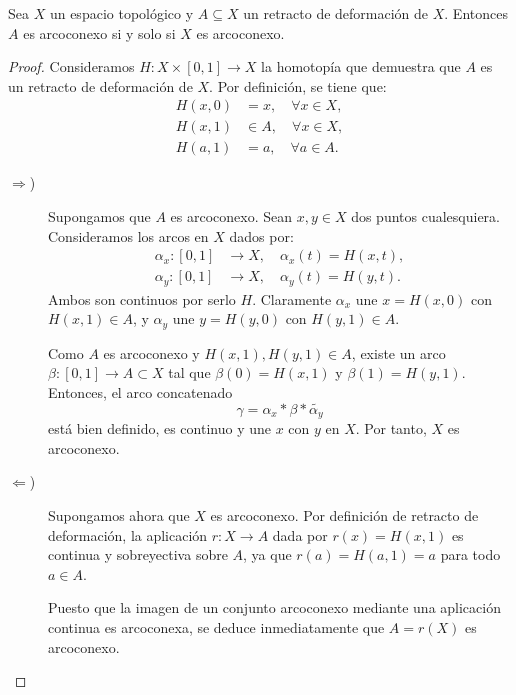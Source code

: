 \begin{prop}
    Sea $X$ un espacio topológico y $A \subseteq X$ un retracto de deformación de $X$. Entonces $A$ es arcoconexo si y solo si $X$ es arcoconexo.
    \begin{proof}
        Consideramos $H:X\times[0,1]\to X$ la homotopía que demuestra que $A$ es un retracto de deformación de $X$. Por definición, se tiene que:
        \begin{align*}
            H(x,0) &= x, \quad \forall x \in X, \\
            H(x,1) &\in A, \quad \forall x \in X, \\
            H(a,1) &= a, \quad \forall a \in A.
        \end{align*}

        \begin{description}
            \item[$\Longrightarrow$)] Supongamos que $A$ es arcoconexo. Sean $x, y \in X$ dos puntos cualesquiera. Consideramos los arcos en $X$ dados por:
            \begin{align*}
                \alpha_x \colon [0,1] &\longrightarrow X, \quad \alpha_x(t) = H(x,t), \\
                \alpha_y \colon [0,1] &\longrightarrow X, \quad \alpha_y(t) = H(y,t).
            \end{align*}
            Ambos son continuos por serlo $H$. Claramente $\alpha_x$ une $x = H(x,0)$ con $H(x,1) \in A$, y $\alpha_y$ une $y = H(y,0)$ con $H(y,1) \in A$.
            
            Como $A$ es arcoconexo y $H(x,1), H(y,1) \in A$, existe un arco $\beta \colon [0,1] \to A \subset X$ tal que $\beta(0) = H(x,1)$ y $\beta(1) = H(y,1)$. Entonces, el arco concatenado
            \begin{equation*}
                \gamma = \alpha_x * \beta * \widetilde{\alpha_y}
            \end{equation*}
            está bien definido, es continuo y une $x$ con $y$ en $X$. Por tanto, $X$ es arcoconexo.

            \item[$\Longleftarrow$)] Supongamos ahora que $X$ es arcoconexo. Por definición de retracto de deformación, la aplicación $r \colon X \to A$ dada por $r(x) = H(x,1)$ es continua y sobreyectiva sobre $A$, ya que $r(a) = H(a,1) = a$ para todo $a \in A$. 
            
            Puesto que la imagen de un conjunto arcoconexo mediante una aplicación continua es arcoconexa, se deduce inmediatamente que $A = r(X)$ es arcoconexo.\qedhere
        \end{description}
    \end{proof}
\end{prop}

